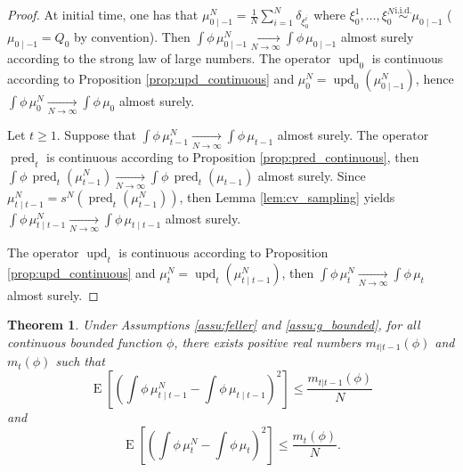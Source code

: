 \documentclass{article}
\newtheorem{thm}{Theorem}
\newcommand{\simiid}{\overset{\text{i.i.d.}}{\sim}}
\newcommand{\limN}{\underset{N \rightarrow \infty}{\longrightarrow}}
\DeclareMathOperator{\E}{E}
\DeclareMathOperator{\pred}{pred}
\DeclareMathOperator{\upd}{upd}
\begin{document}
\begin{proof}
    At initial time, one has that $\displaystyle \mu^N_{0 \mid -1} = \frac 1N \sum_{i=1}^N \delta_{\xi^i_0}$ where $\xi^1_0,\dots,\xi^N_0 \simiid \mu_{0 \mid -1}$ ($\mu_{0 \mid -1} = Q_0$ by convention). Then $\displaystyle \int \phi \, \mu^N_{0 \mid -1} \limN \int \phi \, \mu_{0 \mid -1}$ almost surely according to the strong law of large numbers. The operator $\upd_0$ is continuous according to Proposition \ref{prop:upd_continuous} and $\mu^N_0 = \upd_0(\mu^N_{0 \mid -1})$, hence $\displaystyle \int \phi \, \mu^N_0 \limN \int \phi \, \mu_0$ almost surely.
    
    Let $t \geq 1$. Suppose that $\displaystyle \int \phi \, \mu^N_{t-1} \limN \int \phi \, \mu_{t-1}$ almost surely. The operator $\pred_t$ is continuous according to Proposition \ref{prop:pred_continuous}, then $\displaystyle \int \phi \, \pred_t(\mu^N_{t-1}) \limN \int \phi \, \pred_t(\mu_{t-1})$ almost surely. Since $\mu^N_{t \mid t-1} = s^N(\pred_t(\mu^N_{t-1}))$, then Lemma \ref{lem:cv_sampling} yields $\displaystyle \int \phi \, \mu^N_{t \mid t-1} \limN \int \phi \, \mu_{t \mid t-1}$ almost surely.
    
    The operator $\upd_t$ is continuous according to Proposition \ref{prop:upd_continuous} and $\mu^N_t = \upd_t(\mu^N_{t \mid t-1})$, then $\displaystyle \int \phi \, \mu^N_t \limN \int \phi \, \mu_t$ almost surely.
\end{proof}

\begin{thm}\label{thm:cv_filter_l2}
    Under Assumptions \ref{assu:feller} and \ref{assu:g_bounded}, for all continuous bounded function $\phi$, there exists positive real numbers $m_{t|t-1}(\phi)$ and $m_t(\phi)$ such that
    $$\E[(\int \phi \, \mu^N_{t \mid t-1} - \int \phi \, \mu_{t \mid t-1})^2] \leq \frac{m_{t|t-1}(\phi)}{N}$$
    and
    $$\E[(\int \phi \, \mu^N_t - \int \phi \, \mu_t)^2] \leq \frac{m_t(\phi)}{N}.$$
\end{thm}
\end{document}
